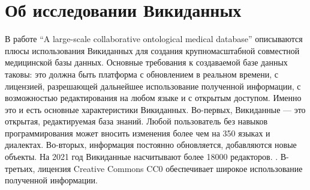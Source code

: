 \section{Об исследовании Викиданных}

В работе ``A large-scale collaborative ontological medical database''\cite{Collaborative_ontological_database} 
описываются плюсы использования Викиданных для создания крупномасштабной 
совместной медицинской базы данных. 
Основные требования к создаваемой базе данных таковы: 
это должна быть платформа с обновлением в реальном времени, 
с лицензией, разрешающей дальнейшее использование полученной информации, 
с возможностью редактирования на любом языке и с открытым доступом. 
Именно это и есть основные характеристики Викиданных. 
Во-первых, Викиданные — это открытая, редактируемая база знаний. 
Любой пользователь без навыков программирования может вносить изменения 
более чем на 350 языках и диалектах. 
Во-вторых, информация постоянно обновляется, добавляются новые объекты. 
На 2021 год Викиданные насчитывают более 18000 редакторов\footnotemark. 
%
. 
В-третьих, лицензия Creative Commons CC0 обеспечивает широкое использование полученной информации. 

